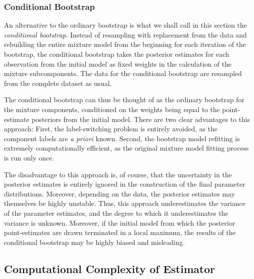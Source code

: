 \documentclass[10pt]{olplainarticle}\usepackage[]{graphicx}\usepackage[]{color}
\begin{document}
\subsubsection{Conditional Bootstrap}

An alternative to the ordinary bootstrap is what we shall call in this section the \emph{conditional bootstrap}. Instead of resampling with replacement from the data and rebuilding the entire mixture model from the beginning for each iteration of the bootstrap, the conditional bootstrap takes the posterior estimates for each observation from the initial model as fixed weights in the calculation of the mixture subcomponents. The data for the conditional bootstrap are resampled from the complete dataset as usual.

The conditional bootstrap can thus be thought of as the ordinary bootstrap for the mixture components, conditioned on the weights being equal to the point-estimate posteriors from the initial model. There are two clear advantages to this approach: First, the label-switching problem is entirely avoided, as the component labels are \emph{a priori} known. Second, the bootstrap model refitting is extremely computationally efficient, as the original mixture model fitting process is run only once.

The disadvantage to this approach is, of course, that the uncertainty in the posterior estimates is entirely ignored in the construction of the final parameter distributions. Moreover, depending on the data, the posterior estimates may themselves be highly unstable. Thus, this approach underestimates the variance of the parameter estimates, and the degree to which it underestimates the variance is unknown. Moreover, if the initial model from which the posterior point-estimates are drawn terminated in a local maximum, the results of the conditional bootstrap may be highly biased and misleading.




\subsection{Computational Complexity of Estimator} \label{seccomplex}
\end{document}
